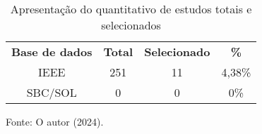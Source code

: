 \begin{table}[H]
\centering
\caption{Apresentação do quantitativo de estudos totais e selecionados}
\begin{tabular}{cccc}
\rowcolor[HTML]{C0C0C0} 
\textbf{Base de dados} & \textbf{Total} & \textbf{Selecionado} & \textbf{\%} \\
IEEE                   & 251            & 11                   & 4,38\%      \\
SBC/SOL                & 0              & 0                    & 0\%        
\end{tabular}
\vspace{0.2cm}

{\centering Fonte: O autor (2024). \par}
\end{table}


